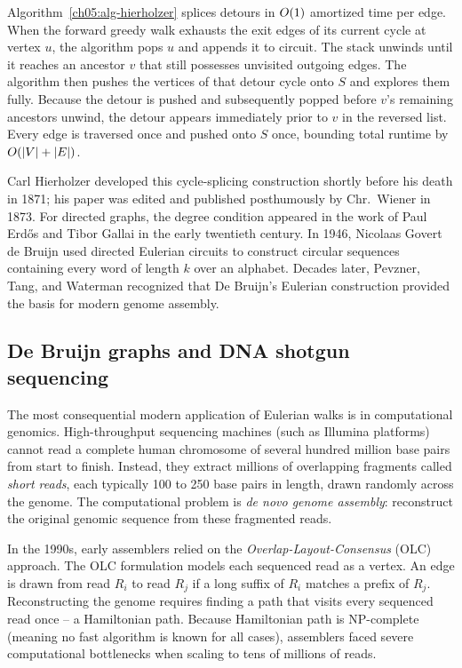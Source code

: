 \begin{whybox}
Algorithm~\ref{ch05:alg-hierholzer} splices detours in $O(1)$ amortized time per edge. When the forward greedy walk exhausts the exit edges of its current cycle at vertex $u$, the algorithm pops $u$ and appends it to $\mathrm{circuit}$. The stack unwinds until it reaches an ancestor $v$ that still possesses unvisited outgoing edges. The algorithm then pushes the vertices of that detour cycle onto $S$ and explores them fully. Because the detour is pushed and subsequently popped before $v$'s remaining ancestors unwind, the detour appears immediately prior to $v$ in the reversed list. Every edge is traversed once and pushed onto $S$ once, bounding total runtime by $O(\lvert V\rvert+\lvert E\rvert)$.
\end{whybox}

\begin{marginnotebox}
Carl Hierholzer developed this cycle-splicing construction shortly before his death in 1871; his paper was edited and published posthumously by Chr.~Wiener in 1873. For directed graphs, the degree condition appeared in the work of Paul Erd\H{o}s and Tibor Gallai in the early twentieth century. In 1946, Nicolaas Govert de Bruijn used directed Eulerian circuits to construct circular sequences containing every word of length $k$ over an alphabet. Decades later, Pevzner, Tang, and Waterman recognized that De Bruijn's Eulerian construction provided the basis for modern genome assembly.
\end{marginnotebox}

\subsection{De Bruijn graphs and DNA shotgun sequencing}

The most consequential modern application of Eulerian walks is in computational genomics. High-throughput sequencing machines (such as Illumina platforms) cannot read a complete human chromosome of several hundred million base pairs from start to finish. Instead, they extract millions of overlapping fragments called \emph{short reads}, each typically 100 to 250 base pairs in length, drawn randomly across the genome. The computational problem is \emph{de novo genome assembly}: reconstruct the original genomic sequence from these fragmented reads.

In the 1990s, early assemblers relied on the \emph{Overlap-Layout-Consensus} (OLC) approach. The OLC formulation models each sequenced read as a vertex. An edge is drawn from read $R_i$ to read $R_j$ if a long suffix of $R_i$ matches a prefix of $R_j$. Reconstructing the genome requires finding a path that visits every sequenced read once -- a Hamiltonian path. Because Hamiltonian path is NP-complete (meaning no fast algorithm is known for all cases), assemblers faced severe computational bottlenecks when scaling to tens of millions of reads.

